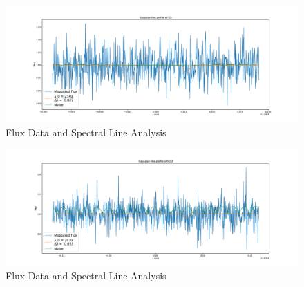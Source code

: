 \documentclass[reprint,english,notitlepage]{revtex4-2}
\begin{document}
    \begin{figure}[h!]
      \centering
      \includegraphics[scale =.3]{Figures/CO 2340}
      \caption{Flux Data and Spectral Line Analysis}
      \label{fig: CO 2340}
    \end{figure}

    \begin{figure}[h!]
      \centering
      \includegraphics[scale =.3]{Figures/N2O 2870}
      \caption{Flux Data and Spectral Line Analysis}
      \label{fig: N20 2870}
    \end{figure}
\clearpage
\twocolumngrid
\end{document}

